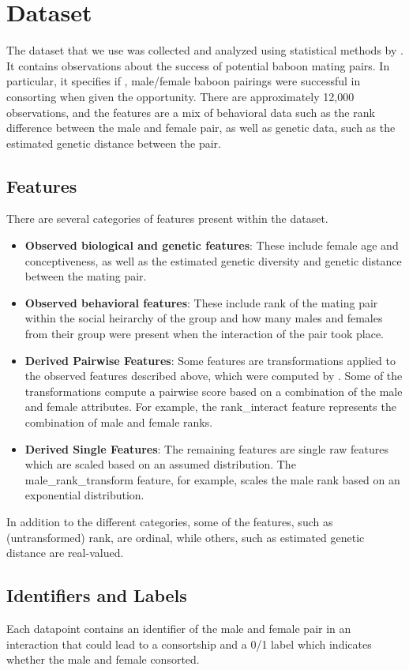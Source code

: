 \documentclass[twoside,twocolumn,paper=letter,fontsize=11pt]{article}
\begin{document}
\section{Dataset}
The dataset that we use was collected and analyzed using statistical methods by
\cite{Tung:2012}. It contains observations about the success of potential baboon
mating pairs. In particular, it specifies if , male/female baboon pairings were
successful in consorting when given the opportunity.  There are approximately
12,000 observations, and the features are a mix of behavioral data such as the
rank difference between the male and female pair, as well as genetic data, such
as the estimated genetic distance between the pair. 
\subsection{Features}
There are several categories of features present within the dataset.
\begin{itemize}
  \item{\textbf{Observed biological and genetic features}: These include female age
    and conceptiveness, as well as the estimated genetic diversity and genetic
    distance between the mating pair.}
  \item{\textbf{Observed behavioral features}: These include rank of the mating pair
    within the social heirarchy of the group and how many males and females from
    their group were present when the interaction of the pair took place.}
  \item{\textbf{Derived Pairwise Features}: Some features are
    transformations applied to the observed features described above, which were
    computed by \cite{Tung:2012}. Some of the transformations compute a pairwise
    score based on a combination of the male and female attributes. For example,
    the rank\_interact feature represents the combination of male and female
    ranks.
    }
  \item{\textbf{Derived Single Features}: The remaining features are single
    raw features which are scaled based on an assumed distribution.  The
    male\_rank\_transform feature, for example, scales the male rank based on an
    exponential distribution.}
\end{itemize}

In addition to the different categories, some of the features, such as
(untransformed) rank, are ordinal, while others, such as estimated genetic
distance are real-valued.

\subsection{Identifiers and Labels}
Each datapoint contains an identifier of the male and female pair in an
interaction that could lead to a consortship and a 0/1 label which indicates
whether the male and female consorted.
\end{document}
